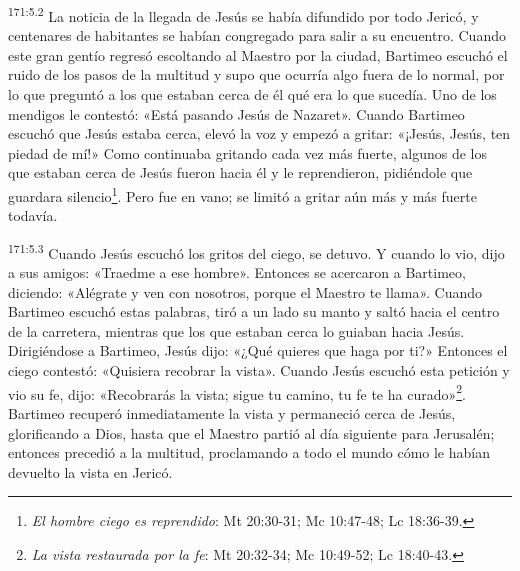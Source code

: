 \par 
\textsuperscript{171:5.2} La noticia de la llegada de Jesús se había difundido por todo Jericó, y centenares de habitantes se habían congregado para salir a su encuentro. Cuando este gran gentío regresó escoltando al Maestro por la ciudad, Bartimeo escuchó el ruido de los pasos de la multitud y supo que ocurría algo fuera de lo normal, por lo que preguntó a los que estaban cerca de él qué era lo que sucedía. Uno de los mendigos le contestó: «Está pasando Jesús de Nazaret». Cuando Bartimeo escuchó que Jesús estaba cerca, elevó la voz y empezó a gritar: «¡Jesús, Jesús, ten piedad de mí!» Como continuaba gritando cada vez más fuerte, algunos de los que estaban cerca de Jesús fueron hacia él y le reprendieron, pidiéndole que guardara silencio\footnote{\textit{El hombre ciego es reprendido}: Mt 20:30-31; Mc 10:47-48; Lc 18:36-39.}. Pero fue en vano; se limitó a gritar aún más y más fuerte todavía.

\par 
\textsuperscript{171:5.3} Cuando Jesús escuchó los gritos del ciego, se detuvo. Y cuando lo vio, dijo a sus amigos: «Traedme a ese hombre». Entonces se acercaron a Bartimeo, diciendo: «Alégrate y ven con nosotros, porque el Maestro te llama». Cuando Bartimeo escuchó estas palabras, tiró a un lado su manto y saltó hacia el centro de la carretera, mientras que los que estaban cerca lo guiaban hacia Jesús. Dirigiéndose a Bartimeo, Jesús dijo: «¿Qué quieres que haga por ti?» Entonces el ciego contestó: «Quisiera recobrar la vista». Cuando Jesús escuchó esta petición y vio su fe, dijo: «Recobrarás la vista; sigue tu camino, tu fe te ha curado»\footnote{\textit{La vista restaurada por la fe}: Mt 20:32-34; Mc 10:49-52; Lc 18:40-43.}. Bartimeo recuperó inmediatamente la vista y permaneció cerca de Jesús, glorificando a Dios, hasta que el Maestro partió al día siguiente para Jerusalén; entonces precedió a la multitud, proclamando a todo el mundo cómo le habían devuelto la vista en Jericó.


